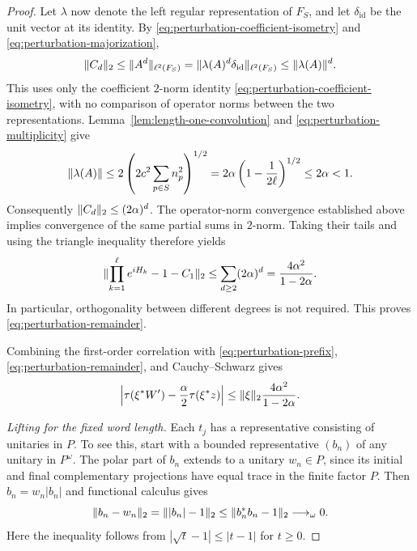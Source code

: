 \begin{proof}
Let $\lambda$ now denote the left regular representation of $F_S$,
and let $\delta_{\mathrm{id}}$ be the unit vector at its identity.
By \eqref{eq:perturbation-coefficient-isometry} and
\eqref{eq:perturbation-majorization},
\[
  \lVert C_d\rVert_2
   \le\lVert A^d\rVert_{\ell^2(F_S)}
   =\lVert \lambda(A)^d\delta_{\mathrm{id}}\rVert_{\ell^2(F_S)}
   \le\lVert \lambda(A)\rVert^d.
\]
This uses only the coefficient $2$-norm identity
\eqref{eq:perturbation-coefficient-isometry}, with no comparison
of operator norms between the two representations.
Lemma~\ref{lem:length-one-convolution} and
\eqref{eq:perturbation-multiplicity} give
\[
  \lVert \lambda(A)\rVert
    \le 2\left(2c^2\sum_{p\in S}n_p^2\right)^{1/2}
    =2\alpha\left(1-\frac1{2\ell}\right)^{1/2}
    \le2\alpha<1.
\]
Consequently $\lVert C_d\rVert_2\le(2\alpha)^d$.
The operator-norm convergence established above implies convergence
of the same partial sums in $2$-norm.  Taking their tails and using
the triangle inequality therefore yields
\[
  \lVert \prod_{k=1}^{\ell}e^{iH_k}-1-C_1\rVert_2
  \le\sum_{d\ge2}(2\alpha)^d
  =\frac{4\alpha^2}{1-2\alpha}.
\]
In particular, orthogonality between different degrees is not
required.  This proves \eqref{eq:perturbation-remainder}.

Combining the first-order correlation with
\eqref{eq:perturbation-prefix}, \eqref{eq:perturbation-remainder},
and Cauchy--Schwarz gives
\begin{equation}\label{eq:perturbation-ultrapower-correlation}
  \left|\tau(\xi^*W')-\frac\alpha2\tau(\xi^*z)\right|
  \le\lVert \xi\rVert_2\frac{4\alpha^2}{1-2\alpha}.
\end{equation}

\smallskip\noindent
\emph{Lifting for the fixed word length.}
Each $t_j$ has a representative consisting of unitaries in $P$.
To see this, start with a bounded representative $(b_n)$ of any
unitary in $P^\omega$.  The polar part of $b_n$ extends to a
unitary $w_n\in P$, since its initial and final complementary
projections have equal trace in the finite factor $P$.
Then $b_n=w_n|b_n|$ and functional calculus gives
\[
  \lVert b_n-w_n\rVert_2=\lVert |b_n|-1\rVert_2
     \le\lVert b_n^*b_n-1\rVert_2\longrightarrow_\omega0.
\]
Here the inequality follows from
$|\sqrt t-1|\le|t-1|$ for $t\ge0$.


\end{proof}
